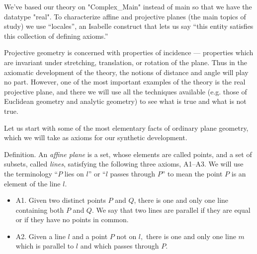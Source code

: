 \begin{isabellebody}
\begin{isamarkuptext}
We've based our theory on "Complex\_Main" instead of main so that we have the datatype "real". To 
characterize affine and projective planes (the main topics of study) we use ``locales'', an Isabelle 
construct that lets us say ``this entity satisfies this collection of defining axioms.''
\done%
\end{isamarkuptext}\isamarkuptrue%
%
\isadelimdocument
%
\endisadelimdocument
%
\isatagdocument
%
\isamarkuptrue%
%
\endisatagdocument
{\isafolddocument}%
%
\isadelimdocument
%
\endisadelimdocument
%
\begin{isamarkuptext}%
\begin{hartshorne}
Projective geometry is concerned with properties of incidence --- properties which are 
invariant under stretching, translation, or rotation of the plane. Thus in the axiomatic 
development of the theory, the notions of distance and angle will play no part.
However, one of the most important examples of the theory is the real projective plane,
and there we will use all the techniques available (e.g. those of Euclidean geometry and analytic 
geometry) to see what is true and what is not true.
\end{hartshorne}%
\end{isamarkuptext}\isamarkuptrue%
%
\isadelimdocument
%
\endisadelimdocument
%
\isatagdocument
%
\isamarkuptrue%
%
\endisatagdocument
{\isafolddocument}%
%
\isadelimdocument
%
\endisadelimdocument
%
\begin{isamarkuptext}%
\begin{hartshorne}
Let us start with some of the most elementary facts of ordinary plane geometry, which we will
take as axioms for our synthetic development.

Definition. An \emph{affine plane} is a set, whose elements are called points, and a set of
subsets, called \emph{lines}, satisfying the following three axioms, A1–A3. We will use the
terminology ``$P$ lies on $l$'' or ``$l$ passes through $P$'' to mean the point $P$ is an 
element of the line $l.$
\begin{itemize}
\item{A1.}
Given two distinct points $P$ and $Q$, there is one and only one line containing both $P$ and $Q.$
We say that two lines are parallel if they are equal or if they have no points in common.\\
\item{A2.}
Given a line $l$ and a point $P$ not on $l,$ there is one and only one line 
$m$ which is parallel to $l$ and which passes through $P.$\\


\end{itemize}
\end{hartshorne}
\end{isamarkuptext}
\end{isabellebody}
